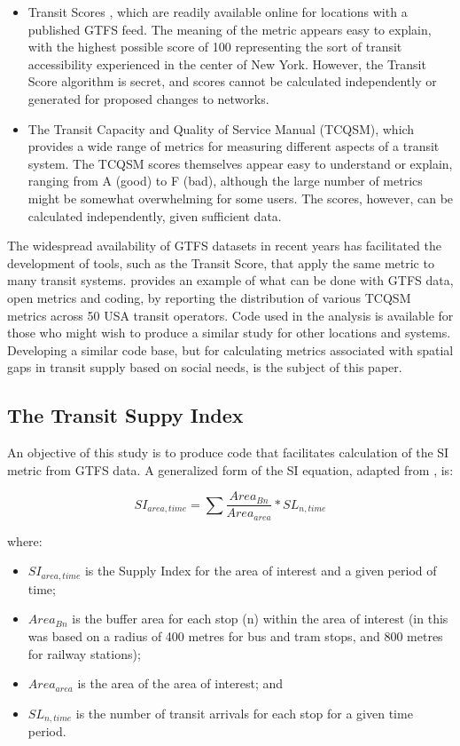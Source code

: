 \documentclass[preprint, 3p,
authoryear]{elsarticle} %
\begin{document}
\begin{itemize}
\item
  Transit Scores \citep{WalkScore:2023tg}, which are readily available
  online for locations with a published GTFS feed. The meaning of the
  metric appears easy to explain, with the highest possible score of 100
  representing the sort of transit accessibility experienced in the
  center of New York. However, the Transit Score algorithm is secret,
  and scores cannot be calculated independently or generated for
  proposed changes to networks.
\item
  The Transit Capacity and Quality of Service Manual (TCQSM), which
  provides a wide range of metrics for measuring different aspects of a
  transit system. The TCQSM scores themselves appear easy to understand
  or explain, ranging from A (good) to F (bad), although the large
  number of metrics might be somewhat overwhelming for some users. The
  scores, however, can be calculated independently, given sufficient
  data.
\end{itemize}

The widespread availability of GTFS datasets in recent years has
facilitated the development of tools, such as the Transit Score, that
apply the same metric to many transit systems. \citet{Wong:2013aa}
provides an example of what can be done with GTFS data, open metrics and
coding, by reporting the distribution of various TCQSM metrics across 50
USA transit operators. Code used in the \citet{Wong:2013aa} analysis is
available for those who might wish to produce a similar study for other
locations and systems. Developing a similar code base, but for
calculating metrics associated with spatial gaps in transit supply based
on social needs, is the subject of this paper.

\subsection{The Transit Suppy Index}\label{the-transit-suppy-index}

An objective of this study is to produce code that facilitates
calculation of the SI metric from GTFS data. A generalized form of the
SI equation, adapted from \citet{currie2010identifying}, is:

\[SI_{area, time} = \sum{\frac{Area_{Bn}}{Area_{area}}*SL_{n, time}}\]

where:

\begin{itemize}
\item
  \(SI_{area, time}\) is the Supply Index for the area of interest and a
  given period of time;
\item
  \(Area_{Bn}\) is the buffer area for each stop (n) within the area of
  interest (in \citet{currie2010identifying} this was based on a radius
  of 400 metres for bus and tram stops, and 800 metres for railway
  stations);
\item
  \(Area_{area}\) is the area of the area of interest; and
\item
  \(SL_{n,time}\) is the number of transit arrivals for each stop for a
  given time period.
\end{itemize}
\end{document}
